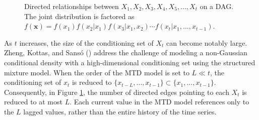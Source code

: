\documentclass[
  letterpaper,
  double,
  12pt,
  1.0in]{beavtex}
\begin{document}
\begin{figure}[htbp]  
    \centering  
    \caption{Directed relationships between $X_1, X_2, X_3, X_4, X_5, ..., X_t$ on a DAG. The joint distribution is factored as $f(\textbf{x}) = f(x_1) f(x_2 | x_1) f(x_3 | x_1, x_2) \cdots f(x_t | x_1, ..., x_{t-1})$.}
    \label{DAG}
\end{figure}

As \(t\) increases, the size of the conditioning set of \(X_t\) can
become notably large. Zheng, Kottas, and Sansó
() address the challenge of
modeling a non-Gaussian conditional density with a high-dimensional
conditioning set using the structured mixture model. When the order of
the MTD model is set to \(L \ll t\), the conditioning set of \(x_t\) is
reduced to \(\{x_{t-L}, ..., x_{t-1} \} \subset \{x_1, ..., x_{t-1}\}\).
Consequently, in Figure \ref{DAG}, the number of directed edges pointing
to each \(X_t\) is reduced to at most \(L\). Each current value in the
MTD model references only to the \(L\) lagged values, rather than the
entire history of the time series.
\end{document}
